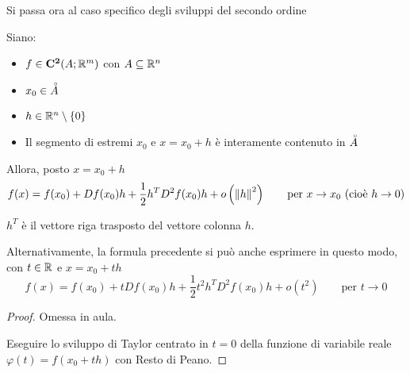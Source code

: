 \noindent Si passa ora al caso specifico degli sviluppi del secondo ordine

\begin{samepage}
	\begin{proposition}
		\label{prop:svil_tay_2_peano}
		Siano:
		\begin{itemize}[noitemsep]
			\item $f \in \mathbf{C^{2}}(A;\mathbb{R}^m)$ con $A \subseteq \mathbb{R}^n$
			\item $x_0 \in \accentset{\circ}{A}$
			\item $h \in \mathbb{R}^n \setminus \left\{0\right\}$
			\item Il segmento di estremi $x_0$ e $x = x_0 + h$ è interamente contenuto in $\accentset{\circ}{A}$
		\end{itemize}
		Allora, posto $x = x_0 + h$
		\[
			f(x) = f(x_0) + Df(x_0)h + \frac{1}{2} h^T D^2f(x_0) h + o\left( \left\|h\right\|^2 \right)
			\qquad
			\text{per } x \to x_0 \text{ (cioè } h \to 0\text{)}
		\]
		\begin{note}
			$h^T$ è il vettore riga trasposto del vettore colonna $h$.
		\end{note}
		Alternativamente, la formula precedente si può anche esprimere in questo modo, con $t \in \mathbb{R}$ e $x = x_0 + th$
		\[
			f(x) = f(x_0) + t Df(x_0) h + \frac{1}{2} t^2 h^T D^2f(x_0) h + o\left( t^2 \right)
			\qquad \text{per } t \to 0
		\]
		\begin{proof}
			Omessa in aula.

			\cbstart
			Eseguire lo sviluppo di Taylor centrato in $t = 0$ della funzione di variabile reale $\varphi(t) = f(x_0 + th)$ con Resto di Peano.
			\cbend
		\end{proof}
	\end{proposition}
\end{samepage}

